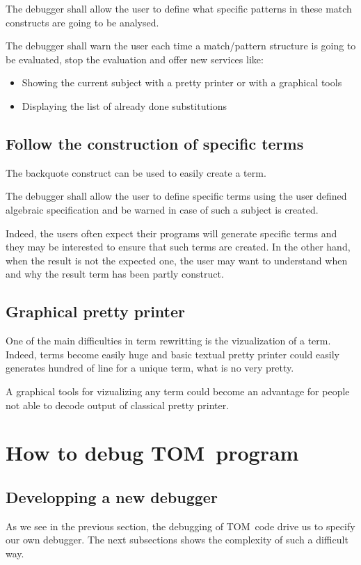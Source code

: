 \documentclass[a4paper]{article}
\newcommand{\TOM}{\textsf{TOM}}
\begin{document}
The debugger shall allow the user to define what specific patterns in
these match constructs are going to be analysed.

The debugger shall warn the user each time a match/pattern structure
is going to be evaluated, stop the evaluation and offer new services like:
\begin{itemize}
\item Showing the current subject with a pretty printer or with a
  graphical tools
\item Displaying the list of already done substitutions
\end{itemize}
\subsection{Follow the construction of specific terms}
The backquote construct can be used to easily create a term.

The debugger shall allow the user to define specific terms using the
user defined algebraic specification and be warned in case of such a
subject is created. 

Indeed, the users  often expect their programs will generate specific
terms and they may be interested to ensure that such terms are
created. In the other hand, when the result is not the expected one,
the user may want to understand when and why the result term has been
partly construct.

\subsection{Graphical pretty printer}
One of the main difficulties in term rewritting is the vizualization
of a term. Indeed, terms become easily huge and basic textual pretty printer
could easily generates hundred of line for a unique term, what is no
very pretty.

A graphical tools for vizualizing any term could become an advantage
for people not able to decode output of classical pretty printer.

\newpage

\section{How to debug \TOM\ program}

\subsection{Developping a new debugger}
As we see in the previous section, the debugging of \TOM\ code drive
us to specify our own debugger. The next subsections shows the
complexity of such a difficult way. 
\end{document}
